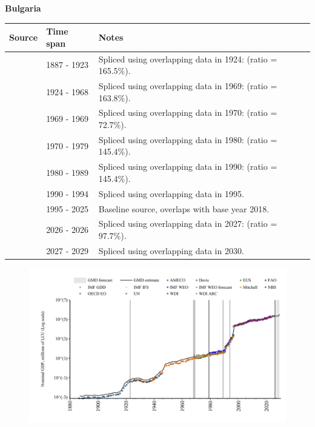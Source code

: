 \documentclass[12pt,a4paper,landscape]{article}
\begin{document}
\begin{adjustbox}{max totalsize={\paperwidth}{\paperheight},center}
\begin{minipage}[t][\textheight][t]{\textwidth}
\vspace*{0.5cm}
{}
\begin{center}
{\Large\bfseries Bulgaria}
\end{center}
\vspace{0.5cm}
\begin{table}[H]
\centering
\small
\begin{tabular}{|l|l|l|}
\hline
\textbf{Source} & \textbf{Time span} & \textbf{Notes} \\
\hline
\rowcolor{white}\cite{NBS}& 1887 - 1923 &Spliced using overlapping data in 1924: (ratio = 165.5\%).\\
\rowcolor{lightgray}\cite{Mitchell}& 1924 - 1968 &Spliced using overlapping data in 1969: (ratio = 163.8\%).\\
\rowcolor{white}\cite{IMF_GDD}& 1969 - 1969 &Spliced using overlapping data in 1970: (ratio = 72.7\%).\\
\rowcolor{lightgray}\cite{UN}& 1970 - 1979 &Spliced using overlapping data in 1980: (ratio = 145.4\%).\\
\rowcolor{white}\cite{WDI}& 1980 - 1989 &Spliced using overlapping data in 1990: (ratio = 145.4\%).\\
\rowcolor{lightgray}\cite{AMECO}& 1990 - 1994 &Spliced using overlapping data in 1995.\\
\rowcolor{white}\cite{OECD_EO}& 1995 - 2025 &Baseline source, overlaps with base year 2018.\\
\rowcolor{lightgray}\cite{AMECO}& 2026 - 2026 &Spliced using overlapping data in 2027: (ratio = 97.7\%).\\
\rowcolor{white}\cite{IMF_WEO_forecast}& 2027 - 2029 &Spliced using overlapping data in 2030.\\
\hline
\end{tabular}
\end{table}
\begin{figure}[H]
\centering
\includegraphics[width=\textwidth,height=0.6\textheight,keepaspectratio]{graphs/BGR_nGDP.pdf}
\end{figure}
\end{minipage}
\end{adjustbox}
\end{document}
